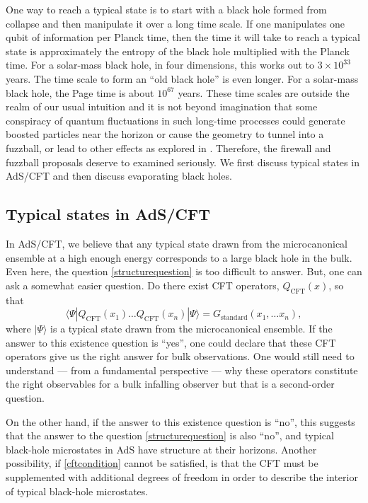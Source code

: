 \documentclass[12pt]{article}
\def\qop{Q}
\newcommand{\be}{\begin{equation}}
\newcommand{\ee}{\end{equation}}
\begin{document}
One way to reach a typical state is to start with a black hole formed from collapse and then manipulate it over a long time scale. If one manipulates one qubit of information per Planck time,  then the time it will take to reach a typical state is approximately the entropy of the black hole multiplied with the Planck time. For a solar-mass black hole, in four dimensions, this works out to $3 \times 10^{33}$ years. The time scale to form an ``old black hole'' is even longer. For a solar-mass black hole, the Page time is about $10^{67}$ years. These time scales are outside the realm of our usual intuition and it is not beyond imagination that some conspiracy of quantum fluctuations in such long-time processes could generate boosted particles near the horizon or cause the geometry to tunnel into a fuzzball, or lead to other effects as explored in \cite{Hutchinson:2013kka}. Therefore, the firewall and fuzzball proposals deserve to examined seriously. We first discuss typical states in AdS/CFT and then discuss evaporating black holes.



\subsection{Typical states in AdS/CFT \label{typicalads}}

In AdS/CFT, we believe that any typical state drawn from the microcanonical ensemble at a high enough energy corresponds to a large black hole in the bulk. Even here, the question \eqref{structurequestion} is too difficult to answer. But, one can ask a somewhat easier question. Do there exist CFT operators, $\qop_{\text{CFT}}(x)$, so that
\be
\label{cftcondition}
\langle \Psi |  \qop_{\text{CFT}}(x_1) \ldots \qop_{\text{CFT}}(x_n) |\Psi \rangle = G_{\text{standard}}(x_1, \ldots x_n),
\ee
where $|\Psi \rangle$ is a typical state drawn from the microcanonical ensemble.
If the answer to this existence question is ``yes'', one could declare that these CFT operators give us the right answer for bulk observations. One would still need to understand --- from a fundamental perspective --- why these operators constitute the right observables for a bulk infalling observer but that is a second-order question.

On the other hand, if the answer to this existence question is ``no'', this suggests that the answer to the question \eqref{structurequestion} is also ``no'', and typical black-hole microstates in AdS have structure at their horizons. Another possibility, if \eqref{cftcondition} cannot be satisfied, is  that the CFT must be supplemented with additional degrees of freedom in order to describe the interior of typical black-hole microstates.
\end{document}
